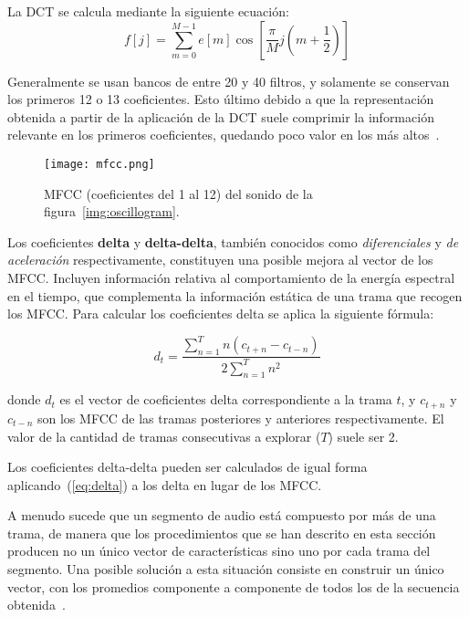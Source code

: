 La DCT se calcula mediante la siguiente ecuación:
\begin{equation}
    \label{eq:DCT}
    f[j] = \sum_{m=0}^{M-1}{e[m]\cos{\left[ \frac{\pi}{M}j\left( m + \frac{1}{2} \right) \right]}}
\end{equation}

Generalmente se usan bancos de entre 20 y 40 filtros, y solamente se conservan los primeros 12 o 13 coeficientes.
Esto último debido a que la representación obtenida a partir de la aplicación de la DCT suele comprimir la información relevante en los primeros coeficientes, quedando poco valor en los más altos~\cite{Davis80}.

\begin{figure}[!h]
    \centering
    \texttt{[image: mfcc.png]}
    \caption{MFCC (coeficientes del 1 al 12) del sonido de la figura~\ref{img:oscillogram}.}
    \label{img:mfcc}
\end{figure}

Los coeficientes \textbf{delta} y \textbf{delta-delta}, también conocidos como \textit{diferenciales} y \textit{de aceleración} respectivamente,
constituyen una posible mejora al vector de los MFCC\@.
Incluyen información relativa al comportamiento de la energía espectral en el tiempo, que complementa la información estática de una trama que recogen los MFCC\@.
Para calcular los coeficientes delta se aplica la siguiente fórmula:

\begin{equation}
    \label{eq:delta}
    d_t = \frac{\sum_{n=1}^{T}{n(c_{t+n} - c_{t-n})}}{2\sum_{n=1}^{T}{n^2}}
\end{equation}

\noindent
donde $d_t$ es el vector de coeficientes delta correspondiente a la trama $t$, y $c_{t+n}$ y $c_{t-n}$ son los MFCC de las tramas posteriores y anteriores respectivamente.
El valor de la cantidad de tramas consecutivas a explorar ($T$) suele ser 2.

Los coeficientes delta-delta pueden ser calculados de igual forma aplicando~(\ref{eq:delta}) a los delta en lugar de los MFCC\@.

A menudo sucede que un segmento de audio está compuesto por más de una trama, de manera que los procedimientos que se han descrito en esta sección producen no un único vector de características sino uno por cada trama del segmento.
Una posible solución a esta situación consiste en construir un único vector, con los promedios componente a componente de todos los de la secuencia obtenida~\cite{Fagerlund07,Lee06}.